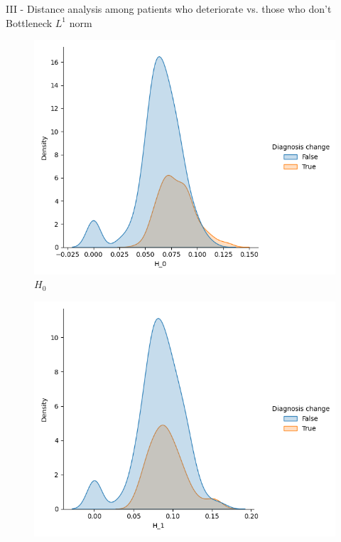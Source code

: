 \documentclass[aspectratio=169, 10pt, dvipsnames]{beamer}
\begin{document}
\begin{frame}[fragile]{III - Distance analysis among patients who deteriorate vs. those who don't}
Bottleneck $L^1$ norm\\
  \begin{figure}
    \centering
    \includegraphics[width=\textwidth]{figures/temporal_evolution/bottleneck_H_0_dist_diag_change.png}
    \caption{$H_0$}
  \end{figure}
  \endminipage
  \hfill
  \begin{figure}
    \centering
    \includegraphics[width=\textwidth]{figures/temporal_evolution/bottleneck_H_1_dist_diag_change.png}

\end{figure}
\end{frame}
\end{document}
